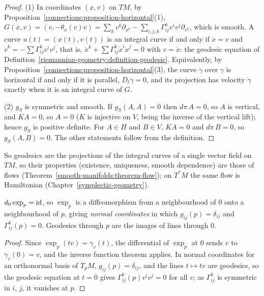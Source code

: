 \begin{proof}
(1) In coordinates $(x, v)$ on $TM$, by Proposition~\ref{connections:proposition-horizontal}(1), $G(x, v) = (v, -\theta_x(v)v) = \sum_kv^k\partial_{x^k} - \sum_{i,j,k}\Gamma^k_{ij}v^iv^j\partial_{v^k}$, which is smooth.
A curve $u(t) = (x(t), v(t))$ is an integral curve if and only if $\dot x = v$ and $\dot v^k = -\sum\Gamma^k_{ij}v^iv^j$, that is, $\ddot x^k + \sum\Gamma^k_{ij}\dot x^i\dot x^j = 0$ with $v = \dot x$: the
geodesic equation of Definition~\ref{riemannian-geometry:definition-geodesic}. Equivalently, by Proposition~\ref{connections:proposition-horizontal}(3), the curve $\dot\gamma$ over $\gamma$ is horizontal if
and only if it is parallel, $D_t\dot\gamma = 0$, and its projection has velocity $\dot\gamma$ exactly when it is an integral curve of $G$.

(2) $g_S$ is symmetric and smooth. If $g_S(A, A) = 0$ then $d\pi\,A = 0$, so $A$ is vertical, and $KA = 0$, so $A = 0$ ($K$ is injective on $V$, being the inverse of the vertical lift); hence $g_S$ is
positive definite. For $A \in H$ and $B \in V$, $KA = 0$ and $d\pi\,B = 0$, so $g_S(A, B) = 0$. The other statements follow from the definition.
\end{proof}

So geodesics are the projections of the integral curves of a single vector field on $TM$, so their properties (existence, uniqueness, smooth
dependence) are those of flows (Theorem~\ref{smooth-manifolds:theorem-flow}); on $T^*M$ the same flow is Hamiltonian (Chapter~\ref{symplectic-geometry}).

\begin{proposition}\label{riemannian-geometry:proposition-exponential}
$d_0\exp_p = \mathrm{id}$, so $\exp_p$ is a diffeomorphism from a neighbourhood of $0$ onto a neighbourhood of $p$, giving \emph{normal coordinates} in which $g_{ij}(p) = \delta_{ij}$ and $\Gamma^k_{ij}(p) = 0$.
Geodesics through $p$ are the images of lines through $0$.
\end{proposition}

\begin{proof}
Since $\exp_p(tv) = \gamma_v(t)$, the differential of $\exp_p$ at $0$ sends $v$ to $\dot\gamma_v(0) = v$, and the inverse function theorem applies. In normal coordinates for an orthonormal basis of $T_pM$, $g_{ij}(p) = \delta_{ij}$, and the lines
$t \mapsto tv$ are geodesics, so the geodesic equation at $t = 0$ gives $\Gamma^k_{ij}(p)v^iv^j = 0$ for all $v$; as $\Gamma^k_{ij}$ is symmetric in $i$, $j$, it vanishes at $p$.
\end{proof}

